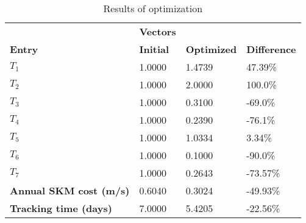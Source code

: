 \begin{table}[H]
\centering
\begin{tabular}{llll}
\textbf{}      & \cellcolor[HTML]{EFEFEF}\textbf{Vectors} & \textbf{} & \textbf{}         \\
\rowcolor[HTML]{EFEFEF} 
\textbf{Entry} & \textbf{Initial} & \textbf{Optimized} & \textbf{Difference} \\
$T_1$ & 1.0000 & 1.4739 & 47.39\% \\ 
$T_2$ & 1.0000 & 2.0000 & 100.0\% \\ 
$T_3$ & 1.0000 & 0.3100 & -69.0\% \\ 
$T_4$ & 1.0000 & 0.2390 & -76.1\% \\ 
$T_5$ & 1.0000 & 1.0334 & 3.34\% \\ 
$T_6$ & 1.0000 & 0.1000 & -90.0\% \\ 
$T_7$ & 1.0000 & 0.2643 & -73.57\% \\ 
\rowcolor[HTML]{EFEFEF} 
\textbf{Annual SKM cost (m/s)}  & 0.6040 & 0.3024 & -49.93\% \\ 
\rowcolor[HTML]{EFEFEF} 
\textbf{Tracking time (days)}  & 7.0000 & 5.4205 & -22.56\% \\ 
\end{tabular}
\caption{Results of optimization}
\label{tab:OptimizationAnalysis}
\end{table}